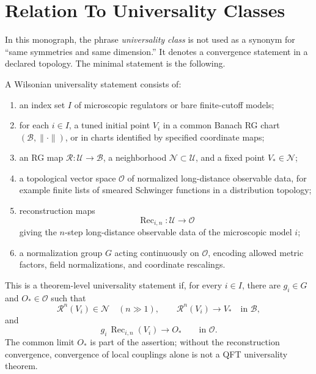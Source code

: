 \section{Relation To Universality Classes}

In this monograph, the phrase \emph{universality class} is not used as a
synonym for ``same symmetries and same dimension.''  It denotes a convergence
statement in a declared topology.  The minimal statement is the following.

\begin{definition}
\label{def:wilsonian-universality-statement}
A Wilsonian universality statement consists of:
\begin{enumerate}
  \item an index set \(I\) of microscopic regulators or bare finite-cutoff
  models;
  \item for each \(i\in I\), a tuned initial point \(V_i\) in a common Banach
  RG chart \((\mathcal B,\|\cdot\|)\), or in charts identified by specified
  coordinate maps;
  \item an RG map \(\mathcal R:\mathcal U\to\mathcal B\), a neighborhood
  \(\mathcal N\subset\mathcal U\), and a fixed point \(V_\ast\in\mathcal N\);
  \item a topological vector space \(\mathcal O\) of normalized long-distance
  observable data, for example finite lists of smeared Schwinger functions in
  a distribution topology;
  \item reconstruction maps
  \[
    \operatorname{Rec}_{i,n}:\mathcal U\to\mathcal O
  \]
  giving the \(n\)-step long-distance observable data of the microscopic
  model \(i\);
  \item a normalization group \(G\) acting continuously on \(\mathcal O\),
  encoding allowed metric factors, field normalizations, and coordinate
  rescalings.
\end{enumerate}
This is a theorem-level universality statement if, for every \(i\in I\),
there are \(g_i\in G\) and \(O_\ast\in\mathcal O\) such that
\[
  \mathcal R^n(V_i)\in\mathcal N\quad(n\gg1),\qquad
  \mathcal R^n(V_i)\longrightarrow V_\ast\quad\text{in }\mathcal B,
\]
and
\[
  g_i\,\operatorname{Rec}_{i,n}(V_i)
  \longrightarrow O_\ast
  \qquad\text{in }\mathcal O .
\]
The common limit \(O_\ast\) is part of the assertion; without the
reconstruction convergence, convergence of local couplings alone is not a
QFT universality theorem.
\end{definition}

